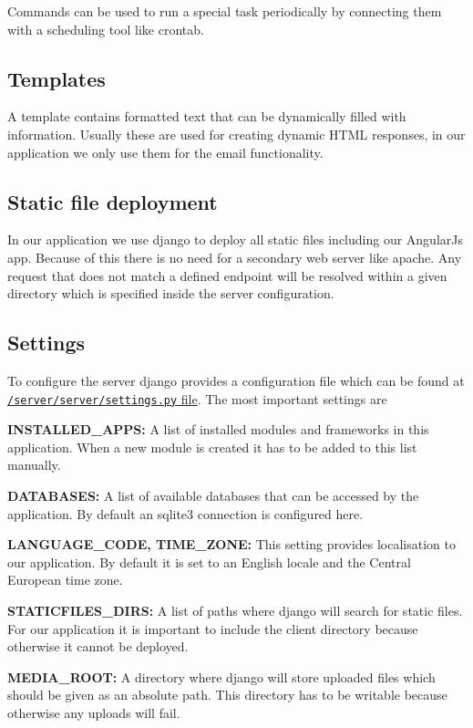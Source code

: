 Commands can be used to run a special task periodically by connecting
them with a scheduling tool like crontab.

\subsection{Templates}\label{templates}

A template contains formatted text that can be dynamically filled with
information. Usually these are used for creating dynamic HTML responses,
in our application we only use them for the email functionality.

\subsection{Static file deployment}\label{static-file-deployment}

In our application we use django to deploy all static files including
our AngularJs app. Because of this there is no need for a secondary web
server like apache. Any request that does not match a defined endpoint
will be resolved within a given directory which is specified inside the
server configuration.

\subsection{Settings}\label{settings}

To configure the server django provides a configuration file which can
be found at
\href{../../server/server/settings.py}{\texttt{/server/server/settings.py}
file}. The most important settings are

\textbf{INSTALLED\_APPS:} A list of installed modules and frameworks in
this application. When a new module is created it has to be added to
this list manually.

\textbf{DATABASES:} A list of available databases that can be accessed
by the application. By default an sqlite3 connection is configured here.

\textbf{LANGUAGE\_CODE, TIME\_ZONE:} This setting provides localisation
to our application. By default it is set to an English locale and the
Central European time zone.

\textbf{STATICFILES\_DIRS:} A list of paths where django will search for
static files. For our application it is important to include the client
directory because otherwise it cannot be deployed.

\textbf{MEDIA\_ROOT:} A directory where django will store uploaded files
which should be given as an absolute path. This directory has to be
writable because otherwise any uploads will fail.

